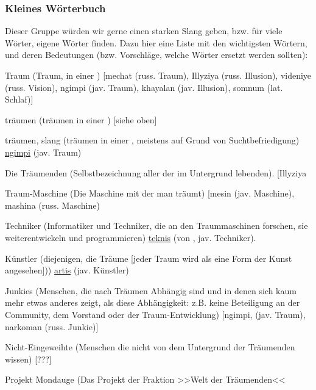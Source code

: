 \documentclass[12pt, a4paper, openany]{report}
\let\tempone\itemize
\let\temptwo\enditemize
\renewenvironment{itemize}{\tempone\addtolength{\itemsep}{-0.5\baselineskip}}{\temptwo}
\begin{document}
\subsubsection{Kleines Wörterbuch}
Dieser Gruppe würden wir gerne einen starken Slang geben, bzw. für viele Wörter, eigene Wörter finden. 
Dazu hier eine Liste mit den wichtigsten Wörtern, und deren Bedeutungen (bzw. Vorschläge, welche Wörter ersetzt werden sollten):
\begin{itemize}
  \item Traum (Traum, in einer ) [mechat (russ. Traum),
    Illyziya (russ. Illusion), videniye (russ. Vision), ngimpi (jav. Traum),
    khayalan (jav. Illusion), somnum (lat. Schlaf)]
  \item träumen (träumen in einer ) [siehe oben]
  \item träumen, slang (träumen in einer , meistens auf Grund von Suchtbefriedigung) \underline{ngimpi} (jav. Traum)
  \item Die Träumenden (Selbstbezeichnung aller der im Untergrund lebenden). [Illyziya
  \item Traum-Maschine (Die Maschine mit der man träumt) [mesin (jav. Maschine), mashina (russ. Maschine)
  \item Techniker (Informatiker und Techniker, die an den Traummaschinen forschen, sie weiterentwickeln und programmieren) \underline{teknis} (von , jav. Techniker).
  \item Künstler (diejenigen, die Träume [jeder Traum wird als eine Form der Kunst angesehen])) \underline{artis} (jav. Künstler)
  \item Junkies (Menschen, die nach Träumen Abhängig sind und in denen sich kaum mehr etwas anderes zeigt, als diese Abhängigkeit: z.B. keine Beteiligung an der Community, dem Vorstand oder der Traum-Entwicklung) [ngimpi, (jav. Traum), narkoman (russ. Junkie)]
  \item Nicht-Eingeweihte (Menschen die nicht von dem Untergrund der Träumenden wissen) [???]
  \item Projekt Mondauge (Das Projekt der Fraktion >>Welt der Träumenden<<
\end{itemize}
\end{document}
